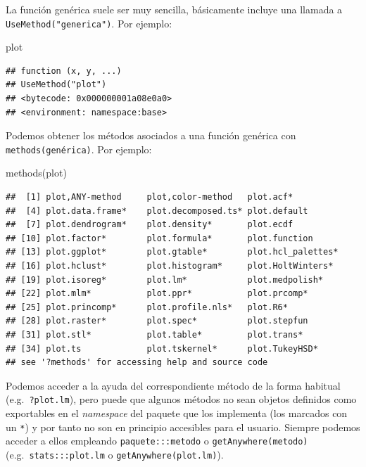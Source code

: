 \documentclass[
]{book}
\newenvironment{Shaded}{\begin{snugshade}}{\end{snugshade}}
\newcommand{\FunctionTok}[1]{\textcolor[rgb]{0.00,0.00,0.00}{#1}}
\newcommand{\NormalTok}[1]{#1}
\theoremstyle{break}
\theoremstyle{nonumberplain}
\begin{document}
La función genérica suele ser muy sencilla, básicamente incluye una llamada a \texttt{UseMethod("generica")}.
Por ejemplo:

\begin{Shaded}
\begin{Highlighting}[]
\NormalTok{plot}
\end{Highlighting}
\end{Shaded}

\begin{verbatim}
## function (x, y, ...) 
## UseMethod("plot")
## <bytecode: 0x000000001a08e0a0>
## <environment: namespace:base>
\end{verbatim}

Podemos obtener los métodos asociados a una función genérica con \texttt{methods(genérica)}.
Por ejemplo:

\begin{Shaded}
\begin{Highlighting}[]
\FunctionTok{methods}\NormalTok{(plot)}
\end{Highlighting}
\end{Shaded}

\begin{verbatim}
##  [1] plot,ANY-method     plot,color-method   plot.acf*          
##  [4] plot.data.frame*    plot.decomposed.ts* plot.default       
##  [7] plot.dendrogram*    plot.density*       plot.ecdf          
## [10] plot.factor*        plot.formula*       plot.function      
## [13] plot.ggplot*        plot.gtable*        plot.hcl_palettes* 
## [16] plot.hclust*        plot.histogram*     plot.HoltWinters*  
## [19] plot.isoreg*        plot.lm*            plot.medpolish*    
## [22] plot.mlm*           plot.ppr*           plot.prcomp*       
## [25] plot.princomp*      plot.profile.nls*   plot.R6*           
## [28] plot.raster*        plot.spec*          plot.stepfun       
## [31] plot.stl*           plot.table*         plot.trans*        
## [34] plot.ts             plot.tskernel*      plot.TukeyHSD*     
## see '?methods' for accessing help and source code
\end{verbatim}

Podemos acceder a la ayuda del correspondiente método de la forma habitual (e.g.~\texttt{?plot.lm}), pero puede que algunos métodos no sean objetos definidos como exportables en el \emph{namespace} del paquete que los implementa (los marcados con un \texttt{*}) y por tanto no son en principio accesibles para el usuario.
Siempre podemos acceder a ellos empleando \texttt{paquete:::metodo} o \texttt{getAnywhere(metodo)} (e.g.~\texttt{stats:::plot.lm} o \texttt{getAnywhere(plot.lm)}).
\end{document}
